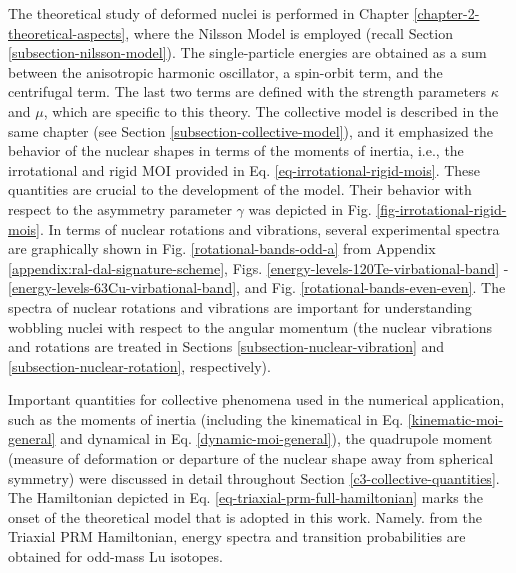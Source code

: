 The theoretical study of deformed nuclei is performed in Chapter \ref{chapter-2-theoretical-aspects}, where the Nilsson Model is employed (recall Section \ref{subsection-nilsson-model}). The single-particle energies are obtained as a sum between the anisotropic harmonic oscillator, a spin-orbit term, and the centrifugal term. The last two terms are defined with the strength parameters $\kappa$ and $\mu$, which are specific to this theory. The collective model is described in the same chapter (see Section \ref{subsection-collective-model}), and it emphasized the behavior of the nuclear shapes in terms of the moments of inertia, i.e., the irrotational and rigid MOI provided in Eq. \ref{eq-irrotational-rigid-mois}. These quantities are crucial to the development of the model. Their behavior with respect to the asymmetry parameter $\gamma$ was depicted in Fig. \ref{fig-irrotational-rigid-mois}. In terms of nuclear rotations and vibrations, several experimental spectra are graphically shown in Fig. \ref{rotational-bands-odd-a} from Appendix \ref{appendix:ral-dal-signature-scheme}, Figs. \ref{energy-levels-120Te-virbational-band} - \ref{energy-levels-63Cu-virbational-band}, and Fig. \ref{rotational-bands-even-even}. The spectra of nuclear rotations and vibrations are important for understanding wobbling nuclei with respect to the angular momentum (the nuclear vibrations and rotations are treated in Sections \ref{subsection-nuclear-vibration} and \ref{subsection-nuclear-rotation}, respectively). 

Important quantities for collective phenomena used in the numerical application, such as the moments of inertia (including the kinematical in Eq. \ref{kinematic-moi-general} and dynamical in Eq. \ref{dynamic-moi-general}), the quadrupole moment (measure of deformation or departure of the nuclear shape away from spherical symmetry) were discussed in detail throughout Section \ref{c3-collective-quantities}. The Hamiltonian depicted in Eq. \ref{eq-triaxial-prm-full-hamiltonian} marks the onset of the theoretical model that is adopted in this work. Namely. from the Triaxial PRM Hamiltonian, energy spectra and transition probabilities are obtained for odd-mass Lu isotopes.

